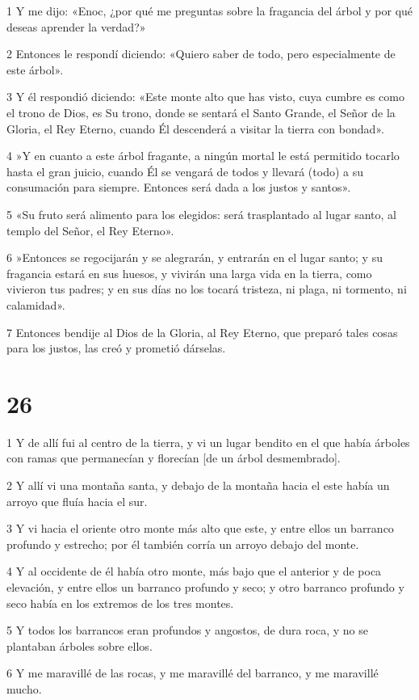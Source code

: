 \par 1 Y me dijo: «Enoc, ¿por qué me preguntas sobre la fragancia del árbol y por qué deseas aprender la verdad?»
\par 2 Entonces le respondí diciendo: «Quiero saber de todo, pero especialmente de este árbol».
\par 3 Y él respondió diciendo: «Este monte alto que has visto, cuya cumbre es como el trono de Dios, es Su trono, donde se sentará el Santo Grande, el Señor de la Gloria, el Rey Eterno, cuando Él descenderá a visitar la tierra con bondad».
\par 4 »Y en cuanto a este árbol fragante, a ningún mortal le está permitido tocarlo hasta el gran juicio, cuando Él se vengará de todos y llevará (todo) a su consumación para siempre. Entonces será dada a los justos y santos».
\par 5 «Su fruto será alimento para los elegidos: será trasplantado al lugar santo, al templo del Señor, el Rey Eterno».
\par 6 »Entonces se regocijarán y se alegrarán, y entrarán en el lugar santo; y su fragancia estará en sus huesos, y vivirán una larga vida en la tierra, como vivieron tus padres; y en sus días no los tocará tristeza, ni plaga, ni tormento, ni calamidad».
\par 7 Entonces bendije al Dios de la Gloria, al Rey Eterno, que preparó tales cosas para los justos, las creó y prometió dárselas.

\chapter{26}

\par 1 Y de allí fui al centro de la tierra, y vi un lugar bendito en el que había árboles con ramas que permanecían y florecían [de un árbol desmembrado].
\par 2 Y allí vi una montaña santa, y debajo de la montaña hacia el este había un arroyo que fluía hacia el sur.
\par 3 Y vi hacia el oriente otro monte más alto que este, y entre ellos un barranco profundo y estrecho; por él también corría un arroyo debajo del monte.
\par 4 Y al occidente de él había otro monte, más bajo que el anterior y de poca elevación, y entre ellos un barranco profundo y seco; y otro barranco profundo y seco había en los extremos de los tres montes.
\par 5 Y todos los barrancos eran profundos y angostos, de dura roca, y no se plantaban árboles sobre ellos.
\par 6 Y me maravillé de las rocas, y me maravillé del barranco, y me maravillé mucho.

